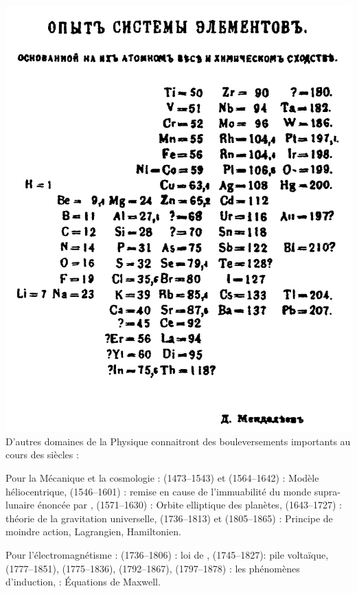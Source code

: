 \marginpar
{
	\vspace{2cm}
	\includegraphics[width=\marginparwidth]{SM/periodique.png}
    \label{periodique}
}
D'autres domaines de la Physique connaitront des bouleversements importants au cours des siècles : 

Pour la Mécanique et la cosmologie :  (\num{1473}--\num{1543}) et  (\num{1564}--\num{1642}) : Modèle héliocentrique,  (\num{1546}--\num{1601}) : remise en cause de  l'immuabilité du monde supra-lunaire énoncée par ,  (\num{1571}--\num{1630}) : Orbite elliptique des planètes,  (\num{1643}--\num{1727}) : théorie de la gravitation universelle,  (\num{1736}--\num{1813}) et  (\num{1805}--\num{1865}) : Principe de moindre action, Lagrangien, Hamiltonien.

Pour l'électromagnétisme :  (\num{1736}--\num{1806}) : loi de ,  (\num{1745}--\num{1827}): pile voltaïque,  (\num{1777}--\num{1851}),  (\num{1775}--\num{1836}),  (\num{1792}--\num{1867}),  (\num{1797}--\num{1878}) : les phénomènes d'induction,  : Équations de Maxwell.

